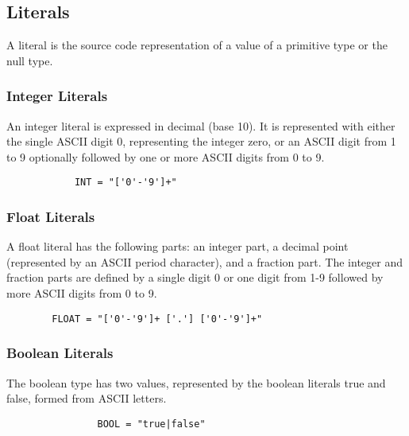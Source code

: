 \begin{homeworkProblem}
	
	\subsection{Literals}
	A literal is the source code representation of a value of a primitive type or the null type.
	
	\subsubsection{Integer Literals}
	An integer literal is expressed in decimal (base 10). It is represented with either the single ASCII digit 0, representing the integer zero, or an ASCII digit from 1 to 9 optionally followed by one or more ASCII digits from 0 to 9. 
	
	\begin{verbatim}
			INT = "['0'-'9']+"
	\end{verbatim}
	
	\subsubsection{Float Literals}
	A float literal has the following parts: an integer part, a decimal point (represented by an ASCII period character), and a fraction part. The integer and fraction parts are defined by a single digit 0 or one digit from 1-9 followed by more ASCII digits from 0 to 9.
	\begin{verbatim}
		FLOAT = "['0'-'9']+ ['.'] ['0'-'9']+"
	\end{verbatim}
	
	\subsubsection{Boolean Literals}
	The boolean type has two values, represented by the boolean literals true and false, formed from ASCII letters.
	\begin{verbatim}
				BOOL = "true|false"
	\end{verbatim}
	

\end{homeworkProblem}
